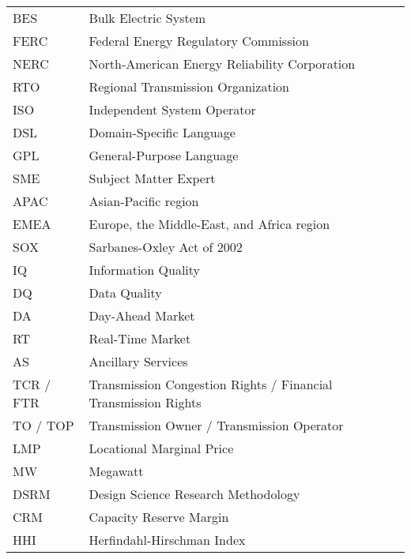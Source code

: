 \hspace*{-1.25in}
\vspace{12pt}
\begin{spacing}{1.0}
	\begin{longtable}[htbp]{@{}p{} p{}@{}}
		BES	& Bulk Electric System \\ [0.5ex]
        FERC & Federal Energy Regulatory Commission \\ [0.5ex]
        NERC & North-American Energy Reliability Corporation \\ [0.5ex]
		RTO & Regional Transmission Organization \\	[0.5ex] %
        ISO & Independent System Operator \\ [0.5ex]
        DSL & Domain-Specific Language \\ [0.5ex]
        GPL & General-Purpose Language \\ [0.5ex]
        SME & Subject Matter Expert \\ [0.5ex]
        APAC & Asian-Pacific region \\ [0.5ex]
        EMEA & Europe, the Middle-East, and Africa region \\ [0.5ex]
        SOX & Sarbanes-Oxley Act of 2002 \\ [0.5ex]
        IQ & Information Quality \\ [0.5ex]
        DQ & Data Quality \\ [0.5ex]
        DA & Day-Ahead Market \\ [0.5ex]
        RT & Real-Time Market \\ [0.5ex]
        AS & Ancillary Services \\ [0.5ex]
        TCR / FTR & Transmission Congestion Rights / Financial Transmission Rights \\ [0.5ex]
        TO / TOP & Transmission Owner / Transmission Operator \\ [0.5ex]
        LMP & Locational Marginal Price \\ [0.5ex]
        MW & Megawatt \\ [0.5ex]
        DSRM & Design Science Research Methodology \\ [0.5ex]
        CRM & Capacity Reserve Margin \\ [0.5ex]
        HHI & Herfindahl-Hirschman Index \\ [0.5ex]
	\end{longtable}
\end{spacing}

\pagebreak{}